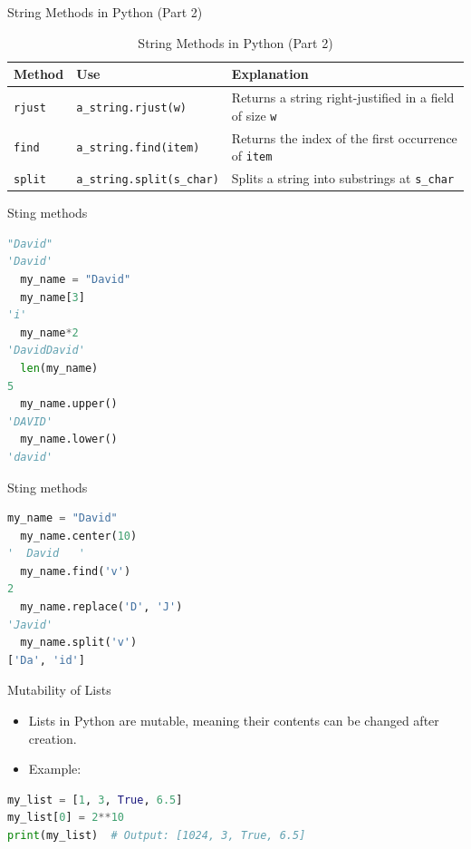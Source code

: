 \begin{frame}{String Methods in Python (Part 2)}
    \begin{table}[]
        \centering
        \begin{tabular}{|l|l|p{5cm}|}
            \hline
            \textbf{Method} & \textbf{Use} & \textbf{Explanation} \\ \hline
            \texttt{rjust} & \texttt{a\_string.rjust(w)} & Returns a string right-justified in a field of size \texttt{w} \\ \hline
            \texttt{find} & \texttt{a\_string.find(item)} & Returns the index of the first occurrence of \texttt{item} \\ \hline
            \texttt{split} & \texttt{a\_string.split(s\_char)} & Splits a string into substrings at \texttt{s\_char} \\ \hline
        \end{tabular}
        \caption{String Methods in Python (Part 2)}
    \end{table}
\end{frame}

\begin{frame}[fragile]{Sting methods}
    \begin{lstlisting}[language=Python]
   "David"
'David'
  my_name = "David"
  my_name[3]
'i'
  my_name*2
'DavidDavid'
  len(my_name)
5
  my_name.upper()
'DAVID'
  my_name.lower()
'david'
\end{lstlisting}
\end{frame}

\begin{frame}[fragile]{Sting methods}
    \begin{lstlisting}[language=Python]
  my_name = "David"
  my_name.center(10)
'  David   '
  my_name.find('v')
2
  my_name.replace('D', 'J')
'Javid'
  my_name.split('v')
['Da', 'id']    
\end{lstlisting}
\end{frame}


\begin{frame}[fragile]{Mutability of Lists}
    \begin{itemize}
        \item Lists in Python are mutable, meaning their contents can be changed after creation.
        \item Example:
    \end{itemize}
    \begin{lstlisting}[language=Python]
my_list = [1, 3, True, 6.5]
my_list[0] = 2**10
print(my_list)  # Output: [1024, 3, True, 6.5]
    \end{lstlisting}
\end{frame}

